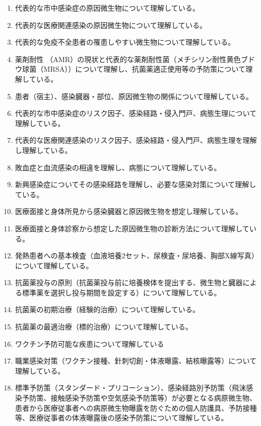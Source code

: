 \begin{enumerate}
\def\labelenumi{\arabic{enumi}.}
\tightlist
\item
  代表的な市中感染症の原因微生物について理解している。
\item
  代表的な医療関連感染の原因微生物について理解している。
\item
  代表的な免疫不全患者の罹患しやすい微生物について理解している。
\item
  薬剤耐性
  （AMR）の現状と代表的な薬剤耐性菌（メチシリン耐性黄色ブドウ球菌（MRSA））について理解し、抗菌薬適正使用等の予防策について理解している。
\item
  患者（宿主）、感染臓器・部位、原因微生物の関係について理解している。
\item
  代表的な市中感染症のリスク因子、感染経路・侵入門戸、病態生理について理解している。
\item
  代表的な医療関連感染のリスク因子、感染経路・侵入門戸、病態生理を理解し理解している。
\item
  敗血症と血流感染の相違を理解し、病態について理解している。
\item
  新興感染症についてその感染経路を理解し、必要な感染対策について理解している。
\item
  医療面接と身体所見から感染臓器と原因微生物を想定し理解している。
\item
  医療面接と身体診察から想定した原因微生物の診断方法について理解している。
\item
  発熱患者への基本検査（血液培養2セット、尿検査・尿培養、胸部X線写真）について理解している。
\item
  抗菌薬投与の原則（抗菌薬投与前に培養検体を提出する、微生物と臓器による標準薬を選択し投与期間を設定する）について理解している。
\item
  抗菌薬の初期治療（経験的治療）について理解している。
\item
  抗菌薬の最適治療（標的治療）について理解している。
\item
  ワクチン予防可能な疾患について理解している
\item
  職業感染対策（ワクチン接種、針刺切創・体液曝露、結核曝露等）について理解している。
\item
  標準予防策（スタンダード・プリコーション）、感染経路別予防策（飛沫感染予防策、接触感染予防策や空気感染予防策等）が必要となる病原微生物、患者から医療従事者への病原微生物曝露を防ぐための個人防護具、予防接種等、医療従事者の体液曝露後の感染予防策について理解している。
\end{enumerate}

